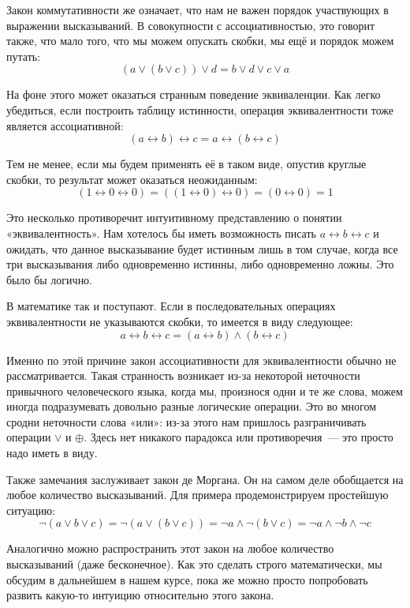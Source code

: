 Закон коммутативности же означает, что нам не важен порядок участвующих в выражении высказываний. В совокупности с ассоциативностью, это говорит также, что мало того, что мы можем опускать скобки, мы ещё и порядок можем путать:
$$
(a \vee (b \vee c)) \vee d = b \vee d \vee c \vee a
$$

На фоне этого может оказаться странным поведение эквиваленции. Как легко убедиться, если построить таблицу истинности, операция эквивалентности тоже является ассоциативной:
$$
(a \leftrightarrow b) \leftrightarrow c = a \leftrightarrow (b \leftrightarrow c)
$$

Тем не менее, если мы будем применять её в таком виде, опустив круглые скобки, то результат может оказаться неожиданным:
$$
(1 \leftrightarrow 0 \leftrightarrow 0) = ((1 \leftrightarrow 0) \leftrightarrow 0) = (0 \leftrightarrow 0) = 1
$$

Это несколько противоречит интуитивному представлению о понятии «эквивалентность». Нам хотелось бы иметь возможность писать $a \leftrightarrow b \leftrightarrow c$ и ожидать, что данное высказывание будет истинным лишь в том случае, когда все три высказывания либо одновременно истинны, либо одновременно ложны. Это было бы логично.

В математике так и поступают. Если в последовательных операциях эквивалентности не указываются скобки, то имеется в виду следующее:
$$
a \leftrightarrow b \leftrightarrow c = (a \leftrightarrow b) \wedge (b \leftrightarrow c)
$$

Именно по этой причине закон ассоциативности для эквивалентности обычно не рассматривается. Такая странность возникает из-за некоторой неточности привычного человеческого языка, когда мы, произнося одни и те же слова, можем иногда подразумевать довольно разные логические операции. Это во многом сродни неточности слова «или»: из-за этого нам пришлось разграничивать операции $\vee$ и $\oplus$. Здесь нет никакого парадокса или противоречия~--- это просто надо иметь в виду.

Также замечания заслуживает закон де Моргана. Он на самом деле обобщается на любое количество высказываний. Для примера продемонстрируем простейшую ситуацию:
$$
\neg(a \vee b \vee c) = \neg(a \vee (b \vee c)) = \neg a \wedge \neg (b \vee c) = \neg a \wedge \neg b \wedge \neg c
$$

Аналогично можно распространить этот закон на любое количество высказываний (даже бесконечное). Как это сделать строго математически, мы обсудим в дальнейшем в нашем курсе, пока же можно просто попробовать развить какую-то интуицию относительно этого закона.

